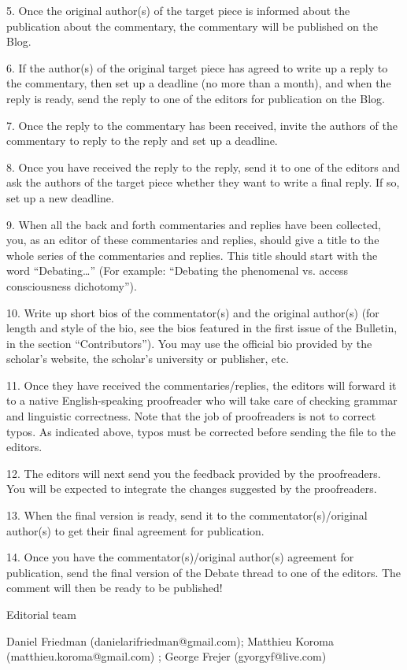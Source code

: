 \documentclass[11pt]{article}
\begin{document}
5. Once the original author(s) of the target piece is informed about the publication about the commentary, the commentary will be published on the Blog.\par

6. If the author(s) of the original target piece has agreed to write up a reply to the commentary, then set up a deadline (no more than a month), and when the reply is ready, send the reply to one of the editors for publication on the Blog.\par

7. Once the reply to the commentary has been received, invite the authors of the commentary to reply to the reply and set up a deadline.\par

8. Once you have received the reply to the reply, send it to one of the editors and ask the authors of the target piece whether they want to write a final reply. If so, set up a new deadline.\par

9. When all the back and forth commentaries and replies have been collected, you, as an editor of these commentaries and replies, should give a title to the whole series of the commentaries and replies. This title should start with the word “Debating…” (For example: “Debating the phenomenal vs. access consciousness dichotomy”).\par

10. Write up short bios of the commentator(s) and the original author(s) (for length and style of the bio, see the bios featured in the first issue of the Bulletin, in the section “Contributors”). You may use the official bio provided by the scholar’s website, the scholar’s university or publisher, etc.\par

11. Once they have received the commentaries/replies, the editors will forward it to a native English-speaking proofreader who will take care of checking grammar and linguistic correctness. Note that the job of proofreaders is not to correct typos. As indicated above, typos must be corrected before sending the file to the editors.\par

12. The editors will next send you the feedback provided by the proofreaders. You will be expected to integrate the changes suggested by the proofreaders.\par

13. When the final version is ready, send it to the commentator(s)/original author(s) to get their final agreement for publication.\par

14. Once you have the commentator(s)/original author(s) agreement for publication, send the final version of the Debate thread to one of the editors. The comment will then be ready to be published!\par

Editorial team\par

Daniel Friedman (danielarifriedman@gmail.com); Matthieu Koroma (matthieu.koroma@gmail.com) ; George Frejer (gyorgyf@live.com)\par
\end{document}
